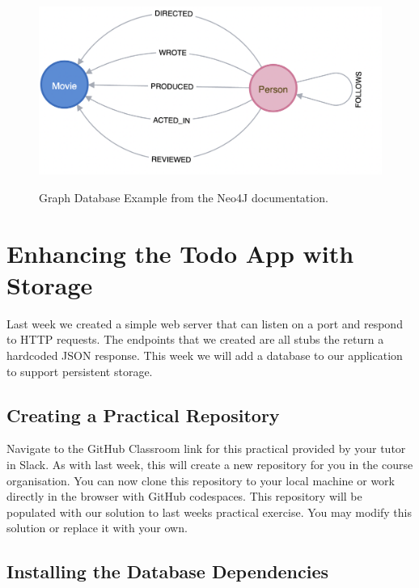 \documentclass{csse4400}
\begin{document}
\begin{figure}[h]
  \href{https://neo4j.com/developer/example-project/}{
    \includegraphics[width=\textwidth]{images/graph}
  }
  \caption{Graph Database Example from the Neo4J documentation.}
\end{figure}

\section{Enhancing the Todo App with Storage}

Last week we created a simple web server that can listen on a port and respond to HTTP requests.
The endpoints that we created are all stubs the return a hardcoded JSON response.
This week we will add a database to our application to support persistent storage.

\subsection{Creating a Practical Repository}
Navigate to the GitHub Classroom link for this practical provided by your tutor in Slack.
As with last week, this will create a new repository for you in the course organisation.
You can now clone this repository to your local machine or work directly in the browser with GitHub codespaces.
This repository will be populated with our solution to last weeks practical exercise.
You may modify this solution or replace it with your own.


\subsection{Installing the Database Dependencies}
\end{document}
